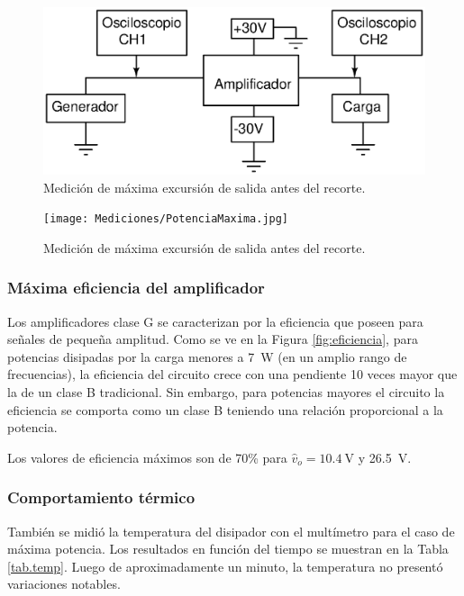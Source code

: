 		\begin{figure}[h!]
			\centering
			\includegraphics[scale=0.5]{Figuras/bco_ganancia.eps}
			\caption{Medición de máxima excursión de salida antes del recorte.}
			\label{fig:bco_ganancia}
		\end{figure}

		\begin{figure}[h!]
			\centering
			\texttt{[image: Mediciones/PotenciaMaxima.jpg]}
			\caption{Medición de máxima excursión de salida antes del recorte.}
			\label{fig:MaxExcur}
		\end{figure}



		\subsubsection{Máxima eficiencia del amplificador}
			Los amplificadores clase G se caracterizan por la eficiencia que poseen para señales de pequeña amplitud. Como se ve en la Figura \ref{fig:eficiencia}, para potencias disipadas por la carga menores a \SI{7}{\W} (en un amplio rango de frecuencias), la eficiencia del circuito crece con una pendiente 10 veces mayor que la de un clase B tradicional. Sin embargo, para potencias mayores el circuito la eficiencia se comporta como un clase B teniendo una relación proporcional a la potencia.

			Los valores de eficiencia máximos son de 70\% para $\hat{v}_o=\SI{10.4}{\V}$ y \SI{26.5}{\V}.


	\subsubsection{Comportamiento térmico}
		También se midió la temperatura del disipador con el multímetro para el caso de máxima potencia. Los resultados en función del tiempo se muestran en la Tabla \ref{tab.temp}. Luego de aproximadamente un minuto, la temperatura no presentó variaciones notables. 

